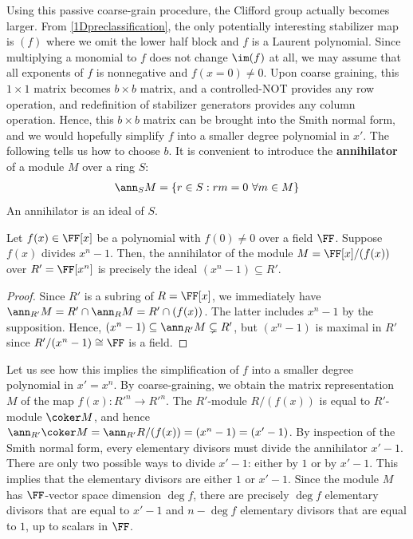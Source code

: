 Using this passive coarse-grain procedure,
the Clifford group actually becomes larger.
From \ref{1Dpreclassification}, the only potentially interesting stabilizer map is $(f)$
where we omit the lower half block and $f$ is a Laurent polynomial.
Since multiplying a monomial to $f$ does not change $\im (f)$ at all,
we may assume that all exponents of $f$ is nonnegative and $f(x=0) \neq 0$.
Upon coarse graining, this $1 \times 1$ matrix becomes $b \times b$ matrix,
and a controlled-NOT provides any row operation,
and redefinition of stabilizer generators provides any column operation.
Hence, this $b \times b$ matrix can be brought into the Smith normal form,
and we would hopefully simplify $f$ into a smaller degree polynomial in $x'$.
The following tells us how to choose $b$.
It is convenient to introduce the {\bf annihilator} of a module $M$ over a ring $S$:
\begin{align}
\ann_S M = \{ r \in S : rm = 0 ~\forall m \in M\}
\end{align}
An annihilator is an ideal of $S$.
\begin{prop}
Let $f(x) \in \FF[x]$ be a polynomial with $f(0) \neq 0$ over a field $\FF$.
Suppose $f(x)$ divides $x^n -1$.
Then, the annihilator of the module $M = \FF[x]/(f(x))$ over $R' = \FF[x^n]$
is precisely the ideal $(x^n - 1) \subseteq R'$.
\label{SubringAnnihilator}
\end{prop}
\begin{proof}
Since $R'$ is a subring of $R = \FF[x]$,
we immediately have $\ann_{R'} M = R' \cap \ann_R M = R' \cap (f(x))$.
The latter includes $x^n -1$ by the supposition.
Hence, $(x^n -1) \subseteq \ann_{R'} M \subsetneq R'$,
but $(x^n -1)$ is maximal in $R'$ since $R'/(x^n -1) \cong \FF$ is a field.
\end{proof}
Let us see how this implies the simplification of $f$ 
into a smaller degree polynomial in $x' = x^n$.
By coarse-graining, we obtain 
the matrix representation $M$ of the map $f(x) : R'^n \to R'^n$.
The $R'$-module $R / (f(x))$ is equal to $R'$-module $\coker M$,
and hence $\ann_{R'} \coker M = \ann_{R'} R/(f(x)) = (x^n -1) = (x'-1)$.
By inspection of the Smith normal form,
every elementary divisors must divide the annihilator $x'-1$.
There are only two possible ways to divide $x'-1$:
either by $1$ or by $x'-1$. This implies that the elementary divisors
are either $1$ or $x'-1$.
Since the module $M$ has $\FF$-vector space dimension $\deg f$,
there are precisely $\deg f$ elementary divisors that are equal to $x'-1$
and $n-\deg f$ elementary divisors that are equal to $1$, up to scalars in $\FF$.

